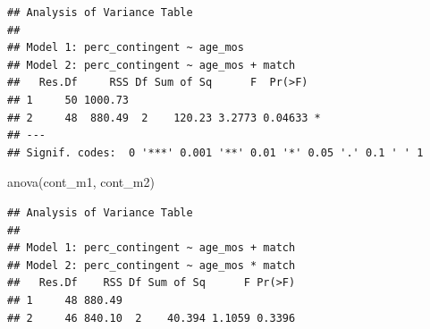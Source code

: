 \documentclass[
]{article}
\newenvironment{Shaded}{\begin{snugshade}}{\end{snugshade}}
\newcommand{\AttributeTok}[1]{\textcolor[rgb]{0.77,0.63,0.00}{#1}}
\newcommand{\CommentTok}[1]{\textcolor[rgb]{0.56,0.35,0.01}{\textit{#1}}}
\newcommand{\DecValTok}[1]{\textcolor[rgb]{0.00,0.00,0.81}{#1}}
\newcommand{\FunctionTok}[1]{\textcolor[rgb]{0.00,0.00,0.00}{#1}}
\newcommand{\NormalTok}[1]{#1}
\newcommand{\OtherTok}[1]{\textcolor[rgb]{0.56,0.35,0.01}{#1}}
\newcommand{\SpecialCharTok}[1]{\textcolor[rgb]{0.00,0.00,0.00}{#1}}
\newcommand{\StringTok}[1]{\textcolor[rgb]{0.31,0.60,0.02}{#1}}
\begin{document}
\begin{verbatim}
## Analysis of Variance Table
## 
## Model 1: perc_contingent ~ age_mos
## Model 2: perc_contingent ~ age_mos + match
##   Res.Df     RSS Df Sum of Sq      F  Pr(>F)  
## 1     50 1000.73                              
## 2     48  880.49  2    120.23 3.2773 0.04633 *
## ---
## Signif. codes:  0 '***' 0.001 '**' 0.01 '*' 0.05 '.' 0.1 ' ' 1
\end{verbatim}

\begin{Shaded}
\begin{Highlighting}[]
\FunctionTok{anova}\NormalTok{(cont\_m1, cont\_m2)}
\end{Highlighting}
\end{Shaded}

\begin{verbatim}
## Analysis of Variance Table
## 
## Model 1: perc_contingent ~ age_mos + match
## Model 2: perc_contingent ~ age_mos * match
##   Res.Df    RSS Df Sum of Sq      F Pr(>F)
## 1     48 880.49                           
## 2     46 840.10  2    40.394 1.1059 0.3396
\end{verbatim}

\begin{Shaded}
\end{Shaded}
\end{document}
